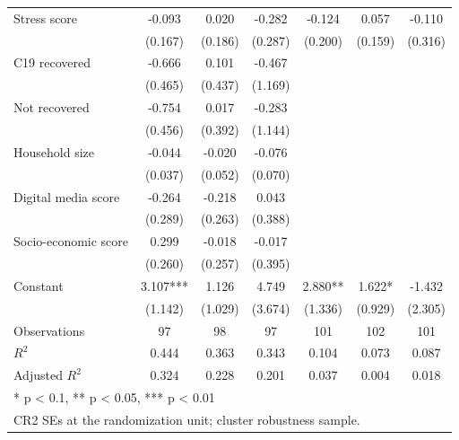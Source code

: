 \begin{table}
\begin{tabular}[t]{lcccccc}
Stress score & -0.093 & 0.020 & -0.282 & -0.124 & 0.057 & -0.110\\
 & (0.167) & (0.186) & (0.287) & (0.200) & (0.159) & (0.316)\\
C19 recovered & -0.666 & 0.101 & -0.467 &  &  & \\
 & (0.465) & (0.437) & (1.169) &  &  & \\
Not recovered & -0.754 & 0.017 & -0.283 &  &  & \\
 & (0.456) & (0.392) & (1.144) &  &  & \\
Household size & -0.044 & -0.020 & -0.076 &  &  & \\
 & (0.037) & (0.052) & (0.070) &  &  & \\
Digital media score & -0.264 & -0.218 & 0.043 &  &  & \\
 & (0.289) & (0.263) & (0.388) &  &  & \\
Socio-economic score & 0.299 & -0.018 & -0.017 &  &  & \\
 & (0.260) & (0.257) & (0.395) &  &  & \\
Constant & 3.107*** & 1.126 & 4.749 & 2.880** & 1.622* & -1.432\\
 & (1.142) & (1.029) & (3.674) & (1.336) & (0.929) & (2.305)\\
Observations & 97 & 98 & 97 & 101 & 102 & 101\\
$R^{2}$ & 0.444 & 0.363 & 0.343 & 0.104 & 0.073 & 0.087\\
Adjusted $R^{2}$ & 0.324 & 0.228 & 0.201 & 0.037 & 0.004 & 0.018\\
\bottomrule
\multicolumn{7}{l}{\rule{0pt}{1em}* p < 0.1, ** p < 0.05, *** p < 0.01}\\
\multicolumn{7}{l}{\rule{0pt}{1em}CR2 SEs at the randomization unit; cluster robustness sample.}\\
\end{tabular}
\end{table}
